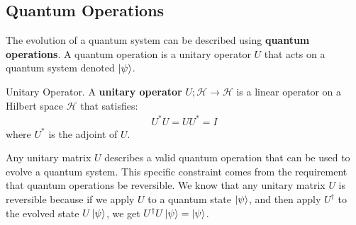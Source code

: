 \subsection{Quantum Operations}

The evolution of a quantum system can be described using \textbf{quantum operations}. A quantum operation is a unitary operator $U$ that acts on a quantum system denoted $\ket{\psi}$.

\begin{definition}{Unitary Operator.}
    A \textbf{unitary operator} $U;\mathcal{H} \to \mathcal{H}$ is a linear operator on a Hilbert space $\mathcal{H}$ that satisfies:
    \begin{align}
        U^*U = UU^* = I
    \end{align}
    where $U^*$ is the adjoint of $U$.
\end{definition}
Any unitary matrix $U$ describes a valid quantum operation that can be used to evolve a quantum system. This specific constraint comes from the requirement that quantum operations be reversible. We know that any unitary matrix $U$ is reversible because if we apply $U$ to a quantum state $\ket{\psi}$, and then apply $U^{\dagger}$ to the evolved state $U\ket{\psi}$, we get $U^{\dagger}U\ket{\psi} = \ket{\psi}$.

